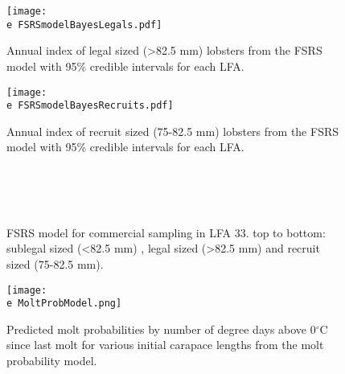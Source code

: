 \documentclass[11pt]{article}
\newcommand{\e}{\string~/bio.data/bio.lobster/figures/LFA2733Framework2018/} %
\begin{document}
    \begin{figure}
    \centering
        \texttt{[image: \\e FSRSmodelBayesLegals.pdf]}
        \caption{Annual index of legal sized (>82.5 mm) lobsters from the FSRS model with 95\% credible intervals for each LFA.}

    \end{figure}


    \begin{figure}
    \centering
        \texttt{[image: \\e FSRSmodelBayesRecruits.pdf]}
        \caption{Annual index of recruit sized (75-82.5 mm) lobsters from the FSRS model with 95\% credible intervals for each LFA.}

    \end{figure}

        \begin{figure}
        \centering
                \\
                \\
                \\
        
         \caption{FSRS model for commercial sampling in LFA 33. top to bottom: sublegal sized (<82.5 mm) , legal sized (>82.5 mm) and recruit sized (75-82.5 mm).}
        \end{figure}





    \begin{figure}
    \centering
        \texttt{[image: \\e MoltProbModel.png]}
        \caption{Predicted molt probabilities by number of degree days above 0$^{\circ}$C since last molt for various initial carapace lengths from the molt probability model.}

    \end{figure}
\end{document}
